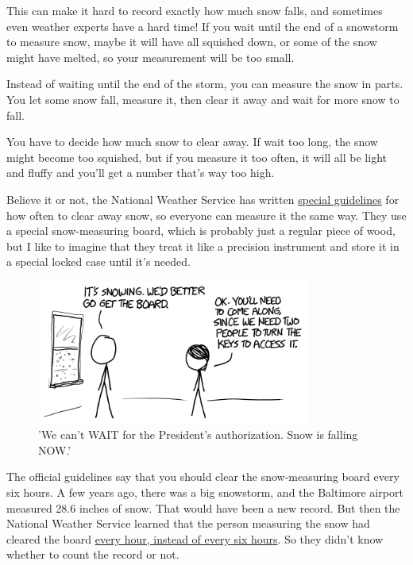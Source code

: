 {{This can make it hard to record exactly how much snow falls, and sometimes even weather experts have a hard time! If you wait until the end of a snowstorm to measure snow, maybe it will have all squished down, or some of the snow might have melted, so your measurement will be too small.}

{Instead of waiting until the end of the storm, you can measure the snow in parts. You let some snow fall, measure it, then clear it away and wait for more snow to fall.}

{You have to decide how much snow to clear away. If wait too long, the snow might become too squished, but if you measure it too often, it will all be light and fluffy and you'll get a number that's way too high.}

{Believe it or not, the National Weather Service has written \href{http://www.srh.noaa.gov/images/mrx/coop/SnowMeasurementTraining.pdf}{special guidelines} for how often to clear away snow, so everyone can measure it the same way. They use a special snow-measuring board, which is probably just a regular piece of wood, but I like to imagine that they treat it like a precision instrument and store it in a special locked case until it's needed.}

\begin{figure}[!htbp]
\centering
\includegraphics[scale=0.5, max width=0.8\textwidth]{imgs/a/104/board.png}
\caption{'We can't WAIT for the President's authorization. Snow is falling NOW.'}
\end{figure}

{The official guidelines say that you should clear the snow-measuring board every six hours. A few years ago, there was a big snowstorm, and the Baltimore airport measured 28.6 inches of snow. That would have been a new record. But then the National Weather Service learned that the person measuring the snow had cleared the board \href{http://articles.baltimoresun.com/2010-02-07/news/bal-md.storm07feb07\_1\_baltimore-washington-forecast-office-snow-depth-biggest-storm}{every hour, instead of every six hours}. So they didn't know whether to count the record or not.}

}
